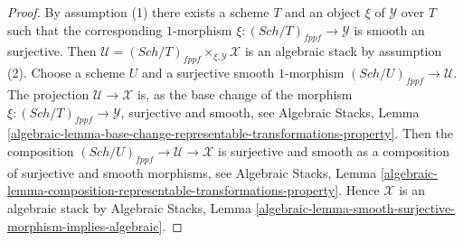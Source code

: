 \documentclass{stacks-project}
\theoremstyle{plain}
\theoremstyle{definition}
\theoremstyle{remark}
\numberwithin{equation}{subsection}
\def\Sch{\mathit{Sch}}
\begin{document}
\begin{proof}
By assumption (1) there exists a scheme $T$ and an object
$\xi$ of $\mathcal{Y}$ over $T$ such that the corresponding
$1$-morphism $\xi : (\Sch/T)_{fppf} \to \mathcal{Y}$
is smooth an surjective. Then
$\mathcal{U} = (\Sch/T)_{fppf} \times_{\xi, \mathcal{Y}} \mathcal{X}$
is an algebraic stack by assumption (2).
Choose a scheme $U$ and a surjective smooth $1$-morphism
$(\Sch/U)_{fppf} \to \mathcal{U}$.
The projection $\mathcal{U} \longrightarrow \mathcal{X}$
is, as the base change of the morphism
$\xi : (\Sch/T)_{fppf} \to \mathcal{Y}$,
surjective and smooth, see
Algebraic Stacks, Lemma
\ref{algebraic-lemma-base-change-representable-transformations-property}.
Then the composition
$(\Sch/U)_{fppf} \to \mathcal{U} \to \mathcal{X}$
is surjective and smooth as a composition of surjective and smooth
morphisms, see
Algebraic Stacks, Lemma
\ref{algebraic-lemma-composition-representable-transformations-property}.
Hence $\mathcal{X}$ is an algebraic stack by
Algebraic Stacks, Lemma
\ref{algebraic-lemma-smooth-surjective-morphism-implies-algebraic}.
\end{proof}
\end{document}
